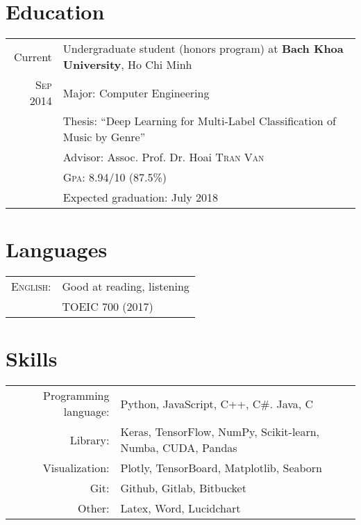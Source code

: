 \documentclass[a4paper,10pt]{article}
\begin{document}
\begin{tabular}{r|p{11cm}}
\end{tabular}
\section{Education}
\begin{tabular}{r|l}
	Current           & Undergraduate student (honors program) at \textbf{Bach Khoa University}, Ho Chi Minh \\
	\textsc{Sep} 2014 & Major: Computer Engineering                                                              \\
	                  & Thesis: ``Deep Learning for Multi-Label Classification of Music by Genre''
	\\
	                  & \small Advisor: Assoc. Prof. Dr. Hoai \textsc{Tran Van}
	\\
	                  & \normalsize \textsc{Gpa}: 8.94/10 (87.5\%)                                               \\
	                  & Expected graduation: July 2018
\end{tabular}

\section{Languages}
\begin{tabular}{rl}
	\textsc{English:}    & Good at reading, listening \\
	                     & TOEIC 700 (2017)           \\
\end{tabular}

\section{Skills}
\begin{tabular}{rp{11cm}}
	Programming language: & Python, JavaScript, C++, C\#. Java, C \\
	Library: & Keras, TensorFlow, NumPy, Scikit-learn, Numba, CUDA, Pandas \\	
	Visualization: & Plotly, TensorBoard, Matplotlib, Seaborn \\
	Git:        & Github, Gitlab, Bitbucket \\
	Other: 			& Latex, Word, Lucidchart \\
\end{tabular}

\end{document}
